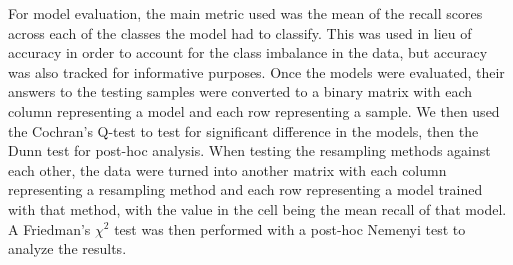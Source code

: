 \documentclass[runningheads]{llncs}
\begin{document}
For model evaluation, the main metric used was the mean of the recall scores across each of the classes the model had to classify. This was used in lieu of accuracy in order to account for the class imbalance in the data, but accuracy was also tracked for informative purposes. Once the models were evaluated, their answers to the testing samples were converted to a binary matrix with each column representing a model and each row representing a sample. We then used the Cochran's Q-test to test for significant difference in the models, then the Dunn test for post-hoc analysis. When testing the resampling methods against each other, the data were turned into another matrix with each column representing a resampling method and each row representing a model trained with that method, with the value in the cell being the mean recall of that model. A Friedman's $\chi^2$ test was then performed with a post-hoc Nemenyi test to analyze the results.
\end{document}
